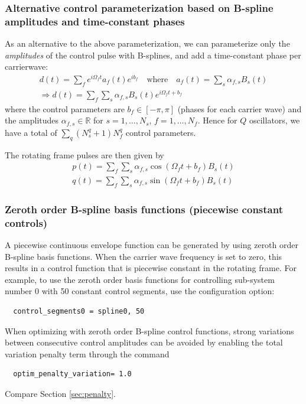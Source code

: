 \documentclass[11pt]{article}
\newcommand{\R}{\mathds{R}}
\begin{document}
  \subsubsection{Alternative control parameterization based on B-spline amplitudes and time-constant phases}
  As an alternative to the above parameterization, we can parameterize only the \textit{amplitudes} of the control pulse with B-splines, and add a time-constant phase per carrierwave:
  \begin{align}
    d(t) = \sum_f e^{i\Omega_f t} a_f(t)e^{ib_f} \quad \text{where} \quad a_f(t) = \sum_s \alpha_{f,s} B_s(t) \\
    \Rightarrow d(t)= \sum_f\sum_s \alpha_{f,s}B_s(t)e^{i\Omega_ft + b_f}
  \end{align}
  where the control parameters are $b_f\in [-\pi, \pi]$ (phases for each carrier wave) and the amplitudes $\alpha_{f,s}\in \R$ for $s=1,\dots, N_s$, $f=1,\dots, N_f$. Hence for $Q$ oscillators, we have a total of $\sum_q (N_s^q + 1) N_f^q$ control parameters.

  The rotating frame pulses are then given by 
  \begin{align}
    p(t) = \sum_f \sum_s \alpha_{f,s} \cos(\Omega_f t + b_f) B_s(t) \\
    q(t) = \sum_f \sum_s \alpha_{f,s} \sin(\Omega_f t + b_f) B_s(t)
  \end{align}

\subsubsection{Zeroth order B-spline basis functions (piecewise constant controls)}\label{subsec:bspline-0}
A piecewise continuous envelope function can be generated by using zeroth order B-spline basis functions. When the carrier wave frequency is set to zero, this results in a control function that is piecewise constant in the rotating frame. For example, to use the zeroth order basis functions for controlling sub-system number 0 with 50 constant control segments, use the configuration option:
\begin{verbatim} 
  control_segments0 = spline0, 50
\end{verbatim}
When optimizing with zeroth order B-spline control functions, strong variations between consecutive control amplitudes can be avoided by enabling the total variation penalty term through the command
\begin{verbatim} 
  optim_penalty_variation= 1.0
\end{verbatim}
Compare Section \ref{sec:penalty}.
\end{document}
